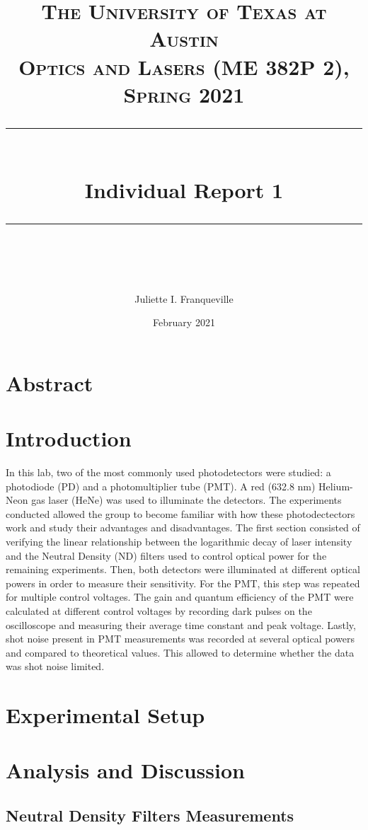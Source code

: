 \documentclass[10pt]{article}
\title{
\normalfont \normalsize 
\textsc{The University of Texas at Austin \\ 
Optics and Lasers (ME 382P 2), Spring 2021} \\
[10pt] 
\rule{\linewidth}{0.5pt} \\[6pt] 
\huge Individual Report 1 \\
\rule{\linewidth}{2pt}  \\[10pt]
}
\author{Juliette I. Franqueville}
\date{\normalsize February 2021}
\newcounter{late}
\begin{document}
\maketitle
\newpage
\tableofcontents
\newpage


\section{Abstract}
 

\section{Introduction}
In this lab, two of the most commonly used photodetectors were studied: a photodiode (PD) and a photomultiplier tube (PMT). A red (632.8 nm) Helium-Neon gas laser (HeNe) was used to illuminate the detectors. The experiments conducted allowed the group to become familiar with how these photodectectors work and study their advantages and disadvantages. The first section consisted of verifying the linear relationship between the logarithmic decay of laser intensity and the Neutral Density (ND) filters used to control optical power for the remaining experiments. Then, both detectors were illuminated at different optical powers in order to measure their sensitivity. For the PMT, this step was repeated for multiple control voltages. The gain and quantum efficiency of the PMT were calculated at different control voltages by recording dark pulses on the oscilloscope and measuring their average time constant and peak voltage. Lastly, shot noise present in PMT measurements was recorded at several optical powers and compared to theoretical values. This allowed to determine whether the data was shot noise limited.



\section {Experimental Setup}











\section {Analysis and Discussion}
\subsection{Neutral Density Filters Measurements}
\end{document}
